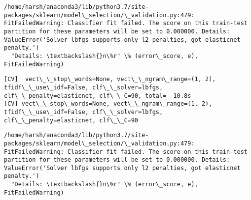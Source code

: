 \documentclass[11pt]{article}
\begin{document}
    \begin{Verbatim}[commandchars=\\\{\}]
/home/harsh/anaconda3/lib/python3.7/site-packages/sklearn/model\_selection/\_validation.py:479: FitFailedWarning: Classifier fit failed. The score on this train-test partition for these parameters will be set to 0.000000. Details: 
ValueError('Solver lbfgs supports only l2 penalties, got elasticnet penalty.')
  "Details: \textbackslash{}n\%r" \% (error\_score, e), FitFailedWarning)

    \end{Verbatim}

    \begin{Verbatim}[commandchars=\\\{\}]
[CV]  vect\_\_stop\_words=None, vect\_\_ngram\_range=(1, 2), tfidf\_\_use\_idf=False, clf\_\_solver=lbfgs, clf\_\_penalty=elasticnet, clf\_\_C=90, total=  10.8s
[CV] vect\_\_stop\_words=None, vect\_\_ngram\_range=(1, 2), tfidf\_\_use\_idf=False, clf\_\_solver=lbfgs, clf\_\_penalty=elasticnet, clf\_\_C=90 

    \end{Verbatim}

    \begin{Verbatim}[commandchars=\\\{\}]
/home/harsh/anaconda3/lib/python3.7/site-packages/sklearn/model\_selection/\_validation.py:479: FitFailedWarning: Classifier fit failed. The score on this train-test partition for these parameters will be set to 0.000000. Details: 
ValueError('Solver lbfgs supports only l2 penalties, got elasticnet penalty.')
  "Details: \textbackslash{}n\%r" \% (error\_score, e), FitFailedWarning)

    \end{Verbatim}
\end{document}
